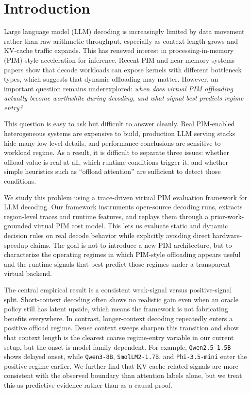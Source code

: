 \section{Introduction}

Large language model (LLM) decoding is increasingly limited by data movement rather than raw arithmetic throughput, especially as context length grows and KV-cache traffic expands. This has renewed interest in processing-in-memory (PIM) style acceleration for inference. Recent PIM and near-memory systems papers show that decode workloads can expose kernels with different bottleneck types, which suggests that dynamic offloading may matter. However, an important question remains underexplored: \emph{when does virtual PIM offloading actually become worthwhile during decoding, and what signal best predicts regime entry?}

This question is easy to ask but difficult to answer cleanly. Real PIM-enabled heterogeneous systems are expensive to build, production LLM serving stacks hide many low-level details, and performance conclusions are sensitive to workload regime. As a result, it is difficult to separate three issues: whether offload value is real at all, which runtime conditions trigger it, and whether simple heuristics such as ``offload attention'' are sufficient to detect those conditions.

We study this problem using a trace-driven virtual PIM evaluation framework for LLM decoding. Our framework instruments open-source decoding runs, extracts region-level traces and runtime features, and replays them through a prior-work-grounded virtual PIM cost model. This lets us evaluate static and dynamic decision rules on real decode behavior while explicitly avoiding direct hardware-speedup claims. The goal is not to introduce a new PIM architecture, but to characterize the operating regimes in which PIM-style offloading appears useful and the runtime signals that best predict those regimes under a transparent virtual backend.

The central empirical result is a consistent weak-signal versus positive-signal split. Short-context decoding often shows no realistic gain even when an oracle policy still has latent upside, which means the framework is not fabricating benefits everywhere. In contrast, longer-context decoding repeatedly enters a positive offload regime. Dense context sweeps sharpen this transition and show that context length is the clearest coarse regime-entry variable in our current setup, but the onset is model-family dependent. For example, \texttt{Qwen2.5-1.5B} shows delayed onset, while \texttt{Qwen3-8B}, \texttt{SmolLM2-1.7B}, and \texttt{Phi-3.5-mini} enter the positive regime earlier. We further find that KV-cache-related signals are more consistent with the observed boundary than attention labels alone, but we treat this as predictive evidence rather than as a causal proof.

